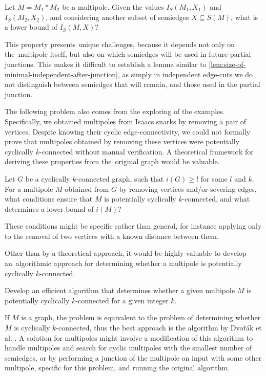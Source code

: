 \documentclass[12pt, twoside]{book}
\begin{document}
\begin{problem}
	Let $M=M_1*M_2$ be a multipole. Given the values $I_S(M_1,X_1)$ and $I_S(M_2,X_2)$, and considering another subset of semiedges $X\subseteq S(M)$, what is a lower bound of $I_S(M,X)$?
\end{problem}

This property presents unique challenges, because it depends not only on the~multipole itself, but also on which semiedges will be used in future partial junctions. This makes it difficult to establish a lemma similar to \cref{lem:size-of-minimal-independent-after-junction}, as simply in independent edge-cuts we do not distinguish between semiedges that will remain, and those used in the partial junction.

The following problem also comes from the exploring of the examples. Specifically, we obtained multipoles from Isaacs snarks by removing a pair of vertices. Despite knowing their cyclic edge-connectivity, we could not formally prove that multipoles obtained by removing these vertices were potentially cyclically $k$-connected without manual verification. A theoretical framework for deriving these properties from the~original graph would be valuable.

\begin{problem}
	Let $G$ be a cyclically $k$-connected graph, such that $i(G)\geq l$ for some $l$ and $k$. For a multipole $M$ obtained from $G$ by removing vertices and/or severing edges, what conditions ensure that $M$ is potentially cyclically $k$-connected, and what determines a lower bound of $i(M)$?
\end{problem}

These conditions might be specific rather than general, for instance applying only to the removal of two vertices with a known distance between them.

Other than by a theoretical approach, it would be highly valuable to develop an~algorithmic approach for determining whether a multipole is potentially cyclically $k$-connected.

\begin{problem}
	Develop an efficient algorithm that determines whether a given multipole $M$ is potentially cyclically $k$-connected for a given integer $k$.
\end{problem}

If $M$ is a graph, the problem is equivalent to the problem of determining whether $M$ is cyclically $k$-connected, thus the best approach is the algorithm by Dvořák et al. \cite{Dvorak2004}. A solution for multipoles might involve a modification of this algorithm to handle multipoles and search for cyclic multipoles with the smallest number of semiedges, or by performing a junction of the multipole on input with some other multipole, specific for this problem, and running the original algorithm.
\end{document}
